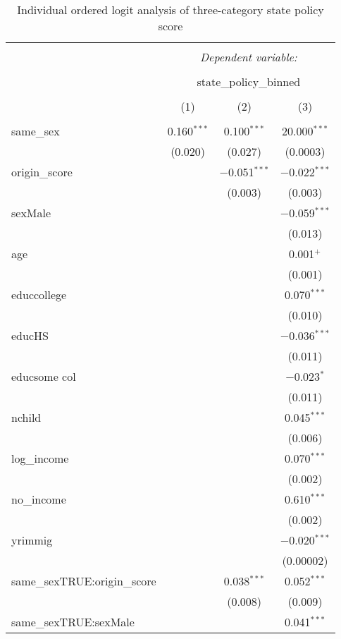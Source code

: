 \documentclass[11pt,]{article}
\begin{document}
\begin{table}[!htbp] \centering 
  \caption{Individual ordered logit analysis of three-category state policy score} 
  \label{tab:ord} 
\begin{tabular}{@{\extracolsep{5pt}}lccc} 
\\[-1.8ex]\hline 
\hline \\[-1.8ex] 
 & \multicolumn{3}{c}{\textit{Dependent variable:}} \\ 
\cline{2-4} 
\\[-1.8ex] & \multicolumn{3}{c}{state\_policy\_binned} \\ 
\\[-1.8ex] & (1) & (2) & (3)\\ 
\hline \\[-1.8ex] 
 same\_sex & 0.160$^{***}$ & 0.100$^{***}$ & 20.000$^{***}$ \\ 
  & (0.020) & (0.027) & (0.0003) \\ 
  origin\_score &  & $-$0.051$^{***}$ & $-$0.022$^{***}$ \\ 
  &  & (0.003) & (0.003) \\ 
  sexMale &  &  & $-$0.059$^{***}$ \\ 
  &  &  & (0.013) \\ 
  age &  &  & 0.001$^{+}$ \\ 
  &  &  & (0.001) \\ 
  educcollege &  &  & 0.070$^{***}$ \\ 
  &  &  & (0.010) \\ 
  educHS &  &  & $-$0.036$^{***}$ \\ 
  &  &  & (0.011) \\ 
  educsome col &  &  & $-$0.023$^{*}$ \\ 
  &  &  & (0.011) \\ 
  nchild &  &  & 0.045$^{***}$ \\ 
  &  &  & (0.006) \\ 
  log\_income &  &  & 0.070$^{***}$ \\ 
  &  &  & (0.002) \\ 
  no\_income &  &  & 0.610$^{***}$ \\ 
  &  &  & (0.002) \\ 
  yrimmig &  &  & $-$0.020$^{***}$ \\ 
  &  &  & (0.00002) \\ 
  same\_sexTRUE:origin\_score &  & 0.038$^{***}$ & 0.052$^{***}$ \\ 
  &  & (0.008) & (0.009) \\ 
  same\_sexTRUE:sexMale &  &  & 0.041$^{***}$ \\ 

\end{tabular}
\end{table}
\end{document}
